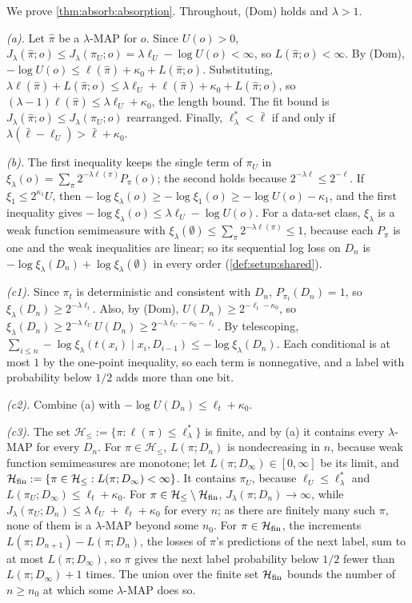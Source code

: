 We prove \cref{thm:absorb:absorption}. Throughout, (Dom) holds and $\lambda>1$.

\emph{(a).} Let $\hat\pi$ be a $\lambda$-MAP for $o$. Since $U(o)>0$, $J_\lambda(\hat\pi;o)\le J_\lambda(\pi_U;o)=\lambda\ell_U-\log U(o)<\infty$, so $L(\hat\pi;o)<\infty$. By (Dom), $-\log U(o)\le\ell(\hat\pi)+\kappa_0+L(\hat\pi;o)$. Substituting, $\lambda\ell(\hat\pi)+L(\hat\pi;o)\le\lambda\ell_U+\ell(\hat\pi)+\kappa_0+L(\hat\pi;o)$, so $(\lambda-1)\ell(\hat\pi)\le\lambda\ell_U+\kappa_0$, the length bound. The fit bound is $J_\lambda(\hat\pi;o)\le J_\lambda(\pi_U;o)$ rearranged. Finally, $\ell^*_\lambda<\bar\ell$ if and only if $\lambda(\bar\ell-\ell_U)>\bar\ell+\kappa_0$.

\emph{(b).} The first inequality keeps the single term of $\pi_U$ in $\xi_\lambda(o)=\sum_\pi2^{-\lambda\ell(\pi)}P_\pi(o)$; the second holds because $2^{-\lambda\ell}\le2^{-\ell}$. If $\xi_1\le2^{\kappa_1}U$, then $-\log\xi_\lambda(o)\ge-\log\xi_1(o)\ge-\log U(o)-\kappa_1$, and the first inequality gives $-\log\xi_\lambda(o)\le\lambda\ell_U-\log U(o)$. For a data-set class, $\xi_\lambda$ is a weak function semimeasure with $\xi_\lambda(\emptyset)\le\sum_\pi2^{-\lambda\ell(\pi)}\le1$, because each $P_\pi$ is one and the weak inequalities are linear; so its sequential log loss on $D_n$ is $-\log\xi_\lambda(D_n)+\log\xi_\lambda(\emptyset)$ in every order (\cref{def:setup:shared}).

\emph{(c1).} Since $\pi_t$ is deterministic and consistent with $D_n$, $P_{\pi_t}(D_n)=1$, so $\xi_\lambda(D_n)\ge2^{-\lambda\ell_t}$. Also, by (Dom), $U(D_n)\ge2^{-\ell_t-\kappa_0}$, so $\xi_\lambda(D_n)\ge2^{-\lambda\ell_U}U(D_n)\ge2^{-\lambda\ell_U-\kappa_0-\ell_t}$. By telescoping, $\sum_{i\le n}-\log\xi_\lambda(t(x_i)\mid x_i,D_{i-1})\le-\log\xi_\lambda(D_n)$. Each conditional is at most $1$ by the one-point inequality, so each term is nonnegative, and a label with probability below $1/2$ adds more than one bit.

\emph{(c2).} Combine (a) with $-\log U(D_n)\le\ell_t+\kappa_0$.

\emph{(c3).} The set $\mathcal H_{\le}:=\{\pi:\ell(\pi)\le\ell^*_\lambda\}$ is finite, and by (a) it contains every $\lambda$-MAP for every $D_n$. For $\pi\in\mathcal H_\le$, $L(\pi;D_n)$ is nondecreasing in $n$, because weak function semimeasures are monotone; let $L(\pi;D_\infty)\in[0,\infty]$ be its limit, and $\mathcal H_{\rm fin}:=\{\pi\in\mathcal H_\le:L(\pi;D_\infty)<\infty\}$. It contains $\pi_U$, because $\ell_U\le\ell^*_\lambda$ and $L(\pi_U;D_\infty)\le\ell_t+\kappa_0$. For $\pi\in\mathcal H_\le\setminus\mathcal H_{\rm fin}$, $J_\lambda(\pi;D_n)\to\infty$, while $J_\lambda(\pi_U;D_n)\le\lambda\ell_U+\ell_t+\kappa_0$ for every $n$; as there are finitely many such $\pi$, none of them is a $\lambda$-MAP beyond some $n_0$. For $\pi\in\mathcal H_{\rm fin}$, the increments $L(\pi;D_{n+1})-L(\pi;D_n)$, the losses of $\pi$'s predictions of the next label, sum to at most $L(\pi;D_\infty)$, so $\pi$ gives the next label probability below $1/2$ fewer than $L(\pi;D_\infty)+1$ times. The union over the finite set $\mathcal H_{\rm fin}$ bounds the number of $n\ge n_0$ at which some $\lambda$-MAP does so.

